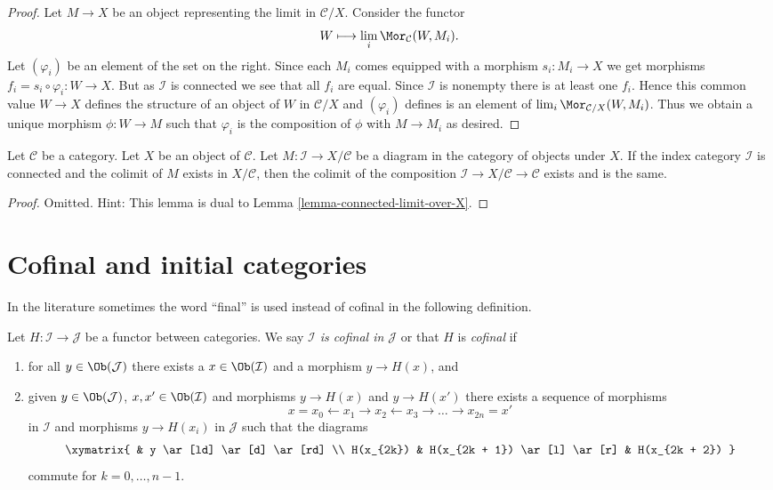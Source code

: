 \begin{proof}
Let $M \to X$ be an object representing the limit in $\mathcal{C}/X$.
Consider the functor
$$
W \longmapsto \lim_i \Mor_\mathcal{C}(W, M_i).
$$
Let $(\varphi_i)$ be an element of the set on the right.
Since each $M_i$ comes equipped with a morphism $s_i : M_i \to X$ we
get morphisms $f_i = s_i \circ \varphi_i : W \to X$. But as $\mathcal{I}$
is connected we see that all $f_i$ are equal. Since $\mathcal{I}$
is nonempty there is at least one $f_i$.
Hence this common value $W \to X$ defines the structure of an
object of $W$ in $\mathcal{C}/X$ and $(\varphi_i)$ defines is an
element of $\lim_i \Mor_{\mathcal{C}/X}(W, M_i)$.
Thus we obtain a unique morphism $\phi : W \to M$ such that
$\varphi_i$ is the composition of $\phi$ with $M \to M_i$ as desired.
\end{proof}

\begin{lemma}
\label{lemma-connected-colimit-under-X}
Let $\mathcal{C}$ be a category.
Let $X$ be an object of $\mathcal{C}$.
Let $M : \mathcal{I} \to X/\mathcal{C}$ be a diagram
in the category of objects under $X$.
If the index category $\mathcal{I}$ is connected
and the colimit of $M$ exists in $X/\mathcal{C}$,
then the colimit of the composition
$\mathcal{I} \to X/\mathcal{C} \to \mathcal{C}$
exists and is the same.
\end{lemma}

\begin{proof}
Omitted. Hint: This lemma is dual to Lemma \ref{lemma-connected-limit-over-X}.
\end{proof}




\section{Cofinal and initial categories}
\label{section-cofinal}

\noindent
In the literature sometimes the word ``final'' is used instead of cofinal
in the following definition.

\begin{definition}
\label{definition-cofinal}
Let $H : \mathcal{I} \to \mathcal{J}$ be a functor between categories.
We say {\it $\mathcal{I}$ is cofinal in $\mathcal{J}$} or that
$H$ is {\it cofinal} if
\begin{enumerate}
\item for all $y \in \Ob(\mathcal{J})$ there exists a
$x \in \Ob(\mathcal{I})$ and a morphism $y \to H(x)$, and
\item given $y \in \Ob(\mathcal{J})$, $x, x' \in \Ob(\mathcal{I})$
and morphisms $y \to H(x)$ and $y \to H(x')$ there exists a sequence
of morphisms
$$
x = x_0 \leftarrow x_1 \rightarrow x_2 \leftarrow x_3 \rightarrow \ldots
\rightarrow x_{2n} = x'
$$
in $\mathcal{I}$ and morphisms $y \to H(x_i)$ in $\mathcal{J}$
such that the diagrams
$$
\xymatrix{
& y \ar[ld] \ar[d] \ar[rd] \\
H(x_{2k}) & H(x_{2k + 1}) \ar[l] \ar[r] & H(x_{2k + 2})
}
$$
commute for $k = 0, \ldots, n - 1$.
\end{enumerate}
\end{definition}

